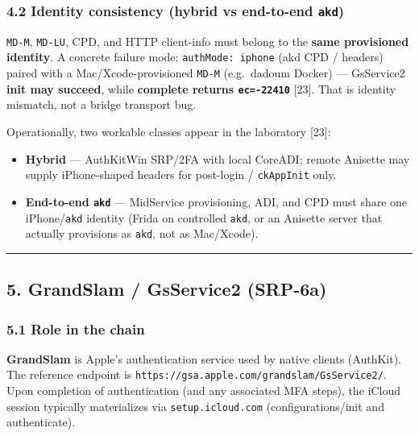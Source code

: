 \documentclass[
  english,
  10pt]{article}
\providecommand{\tightlist}{%
  \setlength{\itemsep}{0pt}\setlength{\parskip}{0pt}}
\begin{document}
\subsubsection{\texorpdfstring{4.2 Identity consistency (hybrid vs
end-to-end
\texttt{akd})}{4.2 Identity consistency (hybrid vs end-to-end akd)}}\label{identity-consistency-hybrid-vs-end-to-end-akd}

\texttt{MD-M}, \texttt{MD-LU}, CPD, and HTTP client-info must belong to
the \textbf{same provisioned identity}. A concrete failure mode:
\texttt{authMode:\ iphone} (akd CPD / headers) paired with a
Mac/Xcode-provisioned \texttt{MD-M} (e.g.~dadoum Docker) --- GsService2
\textbf{init may succeed}, while \textbf{complete returns
\texttt{ec=-22410}} {[}23{]}. That is identity mismatch, not a bridge
transport bug.

Operationally, two workable classes appear in the laboratory {[}23{]}:

\begin{itemize}
\tightlist
\item
  \textbf{Hybrid} --- AuthKitWin SRP/2FA with local CoreADI; remote
  Anisette may supply iPhone-shaped headers for post-login /
  \texttt{ckAppInit} only.
\item
  \textbf{End-to-end \texttt{akd}} --- MidService provisioning, ADI, and
  CPD must share one iPhone/\texttt{akd} identity (Frida on controlled
  \texttt{akd}, or an Anisette server that actually provisions as
  \texttt{akd}, not as Mac/Xcode).
\end{itemize}

\begin{center}\rule{0.5\linewidth}{0.5pt}\end{center}

\subsection{5. GrandSlam / GsService2
(SRP-6a)}\label{grandslam-gsservice2-srp-6a}

\subsubsection{5.1 Role in the chain}\label{role-in-the-chain}

\textbf{GrandSlam} is Apple's authentication service used by native
clients (AuthKit). The reference endpoint is
\texttt{https://gsa.apple.com/grandslam/GsService2/}. Upon completion of
authentication (and any associated MFA steps), the iCloud session
typically materializes via \texttt{setup.icloud.com}
(configurations/init and authenticate).
\end{document}
